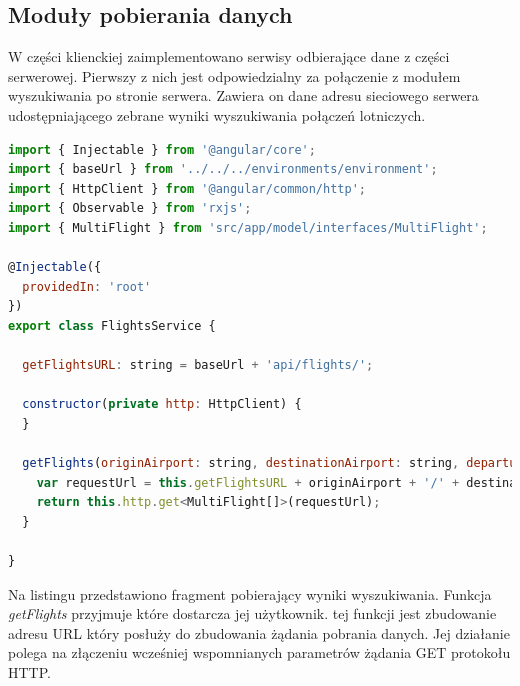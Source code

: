 \documentclass[12pt, twoside]{report}
\begin{document}
\subsection{Moduły pobierania danych}
W części klienckiej zaimplementowano serwisy  odbierające dane z części serwerowej. Pierwszy z nich jest odpowiedzialny za połączenie z modułem wyszukiwania po stronie serwera. Zawiera on dane adresu sieciowego serwera udostępniającego zebrane wyniki wyszukiwania połączeń lotniczych.
\begin{lstlisting}[language=JavaScript, caption= Kod źródłowy funkcji pobierającej wyniki z serwera, label=lst:results]
import { Injectable } from '@angular/core';
import { baseUrl } from '../../../environments/environment';
import { HttpClient } from '@angular/common/http';
import { Observable } from 'rxjs';
import { MultiFlight } from 'src/app/model/interfaces/MultiFlight';

@Injectable({
  providedIn: 'root'
})
export class FlightsService {

  getFlightsURL: string = baseUrl + 'api/flights/';

  constructor(private http: HttpClient) {
  }

  getFlights(originAirport: string, destinationAirport: string, departureDate: string, typeOfConnection: string, currency: string) : Observable<MultiFlight[]>{
    var requestUrl = this.getFlightsURL + originAirport + '/' + destinationAirport + '/' + departureDate + '/' + typeOfConnection + '/' + currency;
    return this.http.get<MultiFlight[]>(requestUrl);   
  }

}
\end{lstlisting}
Na  listingu \add{\ref{lst:results}}  przedstawiono fragment  pobierający wyniki wyszukiwania. Funkcja \textit{getFlights} przyjmuje  które dostarcza jej użytkownik.  tej funkcji jest zbudowanie adresu URL\add{,} który posłuży  do zbudowania żądania pobrania danych. Jej działanie polega na złączeniu wcześniej wspomnianych parametrów  żądania GET protokołu HTTP.
\end{document}
